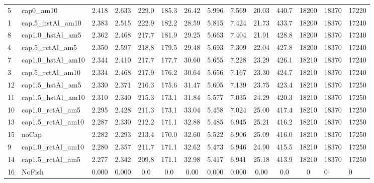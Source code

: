 \documentclass[11pt]{book}
\begin{document}
\begin{landscape}
\begin{longtable}[t]{llccccccccccll}
5 & cap0\_am10 & 2.418 & 2.633 & 229.0 & 185.3 & 26.42 & 5.996 & 7.569 & 20.03 & 440.7 & 18200 & 18370 & 17220\\
1 & cap.5\_hstAl\_am10 & 2.383 & 2.515 & 222.9 & 182.2 & 28.59 & 5.815 & 7.424 & 21.73 & 433.7 & 18200 & 18370 & 17240\\
8 & cap1.0\_hstAl\_am5 & 2.362 & 2.468 & 217.7 & 181.9 & 29.25 & 5.663 & 7.404 & 21.91 & 428.8 & 18200 & 18370 & 17240\\
4 & cap.5\_rctAl\_am5 & 2.350 & 2.597 & 218.8 & 179.5 & 29.48 & 5.693 & 7.309 & 22.04 & 427.8 & 18200 & 18370 & 17240\\
7 & cap1.0\_hstAl\_am10 & 2.344 & 2.410 & 217.7 & 177.7 & 30.60 & 5.655 & 7.228 & 23.29 & 426.1 & 18210 & 18370 & 17240\\
3 & cap.5\_rctAl\_am10 & 2.334 & 2.468 & 217.9 & 176.2 & 30.64 & 5.656 & 7.167 & 23.30 & 424.7 & 18210 & 18370 & 17240\\
12 & cap1.5\_hstAl\_am5 & 2.330 & 2.371 & 216.3 & 175.6 & 31.47 & 5.605 & 7.139 & 23.75 & 423.4 & 18210 & 18370 & 17250\\
11 & cap1.5\_hstAl\_am10 & 2.310 & 2.340 & 215.3 & 173.1 & 31.84 & 5.577 & 7.035 & 24.29 & 420.3 & 18210 & 18370 & 17250\\
10 & cap1.0\_rctAl\_am5 & 2.295 & 2.428 & 211.3 & 173.1 & 33.04 & 5.458 & 7.024 & 25.00 & 417.4 & 18210 & 18370 & 17250\\
13 & cap1.5\_rctAl\_am10 & 2.287 & 2.330 & 212.2 & 171.1 & 32.88 & 5.485 & 6.945 & 25.21 & 416.2 & 18210 & 18370 & 17250\\
15 & noCap & 2.282 & 2.293 & 213.4 & 170.0 & 32.60 & 5.522 & 6.906 & 25.09 & 416.0 & 18210 & 18370 & 17250\\
9 & cap1.0\_rctAl\_am10 & 2.280 & 2.357 & 211.7 & 171.1 & 32.62 & 5.473 & 6.946 & 24.90 & 415.5 & 18210 & 18370 & 17250\\
14 & cap1.5\_rctAl\_am5 & 2.277 & 2.342 & 209.8 & 171.1 & 32.98 & 5.417 & 6.941 & 25.18 & 413.9 & 18210 & 18370 & 17250\\
16 & NoFish & 0.000 & 0.000 & 0.0 & 0.0 & 0.00 & 0.000 & 0.000 & 0.00 & 0.0 & 0 & 0 & 0\\*
\end{longtable}
\endgroup{}
\end{landscape}
\endgroup{}

\newpage
\end{document}
